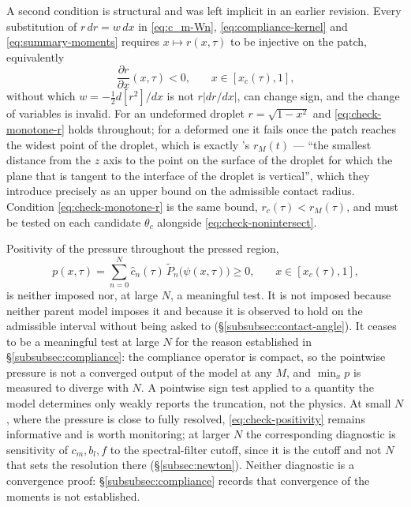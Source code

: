A second condition is structural and was left implicit in an earlier revision. Every substitution of $r\,dr=w\,dx$ in \eqref{eq:c_m-Wn}, \eqref{eq:compliance-kernel} and \eqref{eq:summary-moments} requires $x\mapsto r(x,\tau)$ to be injective on the patch, equivalently
\begin{equation}
    \frac{\partial r}{\partial x}(x,\tau) < 0\text{,}\qquad x\in[x_c(\tau),1]\text{,}
    \label{eq:check-monotone-r}
\end{equation}
without which $w=-\tfrac12d[r^2]/dx$ is not $r|dr/dx|$, can change sign, and the change of variables is invalid. For an undeformed droplet $r=\sqrt{1-x^2}$ and \eqref{eq:check-monotone-r} holds throughout; for a deformed one it fails once the patch reaches the widest point of the droplet, which is exactly \cite{AgueroEtAl2026}'s $r_M(t)$ --- ``the smallest distance from the $z$ axis to the point on the surface of the droplet for which the plane that is tangent to the interface of the droplet is vertical'', which they introduce precisely as an upper bound on the admissible contact radius. Condition \eqref{eq:check-monotone-r} is the same bound, $r_c(\tau)<r_M(\tau)$, and must be tested on each candidate $\theta_c$ alongside \eqref{eq:check-nonintersect}.

Positivity of the pressure throughout the pressed region,
\begin{equation}
    p(x,\tau) = \sum_{n=0}^N\hat c_n(\tau)\,\tilde P_n\big(\psi(x,\tau)\big) \ge 0\text{,}\qquad x\in[x_c(\tau),1]\text{,}
    \label{eq:check-positivity}
\end{equation}
is neither imposed nor, at large $N$, a meaningful test. It is not imposed because neither parent model imposes it and because it is observed to hold on the admissible interval without being asked to (\S\ref{subsubsec:contact-angle}). It ceases to be a meaningful test at large $N$ for the reason established in \S\ref{subsubsec:compliance}: the compliance operator is compact, so the pointwise pressure is not a converged output of the model at any $M$, and $\min_xp$ is measured to diverge with $N$. A pointwise sign test applied to a quantity the model determines only weakly reports the truncation, not the physics. At small $N$, where the pressure is close to fully resolved, \eqref{eq:check-positivity} remains informative and is worth monitoring; at larger $N$ the corresponding diagnostic is sensitivity of $c_m,b_l,f$ to the spectral-filter cutoff, since it is the cutoff and not $N$ that sets the resolution there (\S\ref{subsec:newton}). Neither diagnostic is a convergence proof: \S\ref{subsubsec:compliance} records that convergence of the moments is not established.

